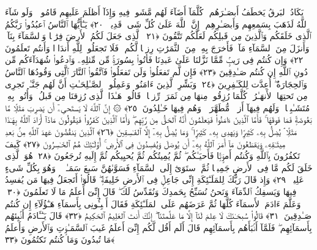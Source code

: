  يَكَادُ ٱلبَرقُ يَخطَفُ أَبصَـٰرَهُم ۖ كُلَّمَآ أَضَآءَ لَهُم مَّشَوا۟ فِيهِ وَإِذَآ أَظلَمَ عَلَيهِم قَامُوا۟ ۚ وَلَو شَآءَ ٱللَّهُ لَذَهَبَ بِسَمعِهِم وَأَبصَـٰرِهِم ۚ إِنَّ ٱللَّهَ عَلَىٰ كُلِّ شَىءٍۢ قَدِيرٌۭ ﴿٢٠﴾
 يَـٰٓأَيُّهَا ٱلنَّاسُ ٱعبُدُوا۟ رَبَّكُمُ ٱلَّذِى خَلَقَكُم وَٱلَّذِينَ مِن قَبلِكُم لَعَلَّكُم تَتَّقُونَ ﴿٢١﴾
 ٱلَّذِى جَعَلَ لَكُمُ ٱلأَرضَ فِرَٰشًۭا وَٱلسَّمَآءَ بِنَآءًۭ وَأَنزَلَ مِنَ ٱلسَّمَآءِ مَآءًۭ فَأَخرَجَ بِهِۦ مِنَ ٱلثَّمَرَٰتِ رِزقًۭا لَّكُم ۖ فَلَا تَجعَلُوا۟ لِلَّهِ أَندَادًۭا وَأَنتُم تَعلَمُونَ ﴿٢٢﴾
 وَإِن كُنتُم فِى رَيبٍۢ مِّمَّا نَزَّلنَا عَلَىٰ عَبدِنَا فَأتُوا۟ بِسُورَةٍۢ مِّن مِّثلِهِۦ وَٱدعُوا۟ شُهَدَآءَكُم مِّن دُونِ ٱللَّهِ إِن كُنتُم صَـٰدِقِينَ ﴿٢٣﴾
 فَإِن لَّم تَفعَلُوا۟ وَلَن تَفعَلُوا۟ فَٱتَّقُوا۟ ٱلنَّارَ ٱلَّتِى وَقُودُهَا ٱلنَّاسُ وَٱلحِجَارَةُ ۖ أُعِدَّت لِلكَـٰفِرِينَ ﴿٢٤﴾
 وَبَشِّرِ ٱلَّذِينَ ءَامَنُوا۟ وَعَمِلُوا۟ ٱلصَّـٰلِحَـٰتِ أَنَّ لَهُم جَنَّـٰتٍۢ تَجرِى مِن تَحتِهَا ٱلأَنهَـٰرُ ۖ كُلَّمَا رُزِقُوا۟ مِنهَا مِن ثَمَرَةٍۢ رِّزقًۭا ۙ قَالُوا۟ هَـٰذَا ٱلَّذِى رُزِقنَا مِن قَبلُ ۖ وَأُتُوا۟ بِهِۦ مُتَشَـٰبِهًۭا ۖ وَلَهُم فِيهَآ أَزوَٟجٌۭ مُّطَهَّرَةٌۭ ۖ وَهُم فِيهَا خَـٰلِدُونَ ﴿٢٥﴾
 ۞ إِنَّ ٱللَّهَ لَا يَستَحىِۦٓ أَن يَضرِبَ مَثَلًۭا مَّا بَعُوضَةًۭ فَمَا فَوقَهَا ۚ فَأَمَّا ٱلَّذِينَ ءَامَنُوا۟ فَيَعلَمُونَ أَنَّهُ ٱلحَقُّ مِن رَّبِّهِم ۖ وَأَمَّا ٱلَّذِينَ كَفَرُوا۟ فَيَقُولُونَ مَاذَآ أَرَادَ ٱللَّهُ بِهَـٰذَا مَثَلًۭا ۘ يُضِلُّ بِهِۦ كَثِيرًۭا وَيَهدِى بِهِۦ كَثِيرًۭا ۚ وَمَا يُضِلُّ بِهِۦٓ إِلَّا ٱلفَـٰسِقِينَ ﴿٢٦﴾
 ٱلَّذِينَ يَنقُضُونَ عَهدَ ٱللَّهِ مِنۢ بَعدِ مِيثَـٰقِهِۦ وَيَقطَعُونَ مَآ أَمَرَ ٱللَّهُ بِهِۦٓ أَن يُوصَلَ وَيُفسِدُونَ فِى ٱلأَرضِ ۚ أُو۟لَـٰٓئِكَ هُمُ ٱلخَـٰسِرُونَ ﴿٢٧﴾
 كَيفَ تَكفُرُونَ بِٱللَّهِ وَكُنتُم أَموَٟتًۭا فَأَحيَـٰكُم ۖ ثُمَّ يُمِيتُكُم ثُمَّ يُحيِيكُم ثُمَّ إِلَيهِ تُرجَعُونَ ﴿٢٨﴾
 هُوَ ٱلَّذِى خَلَقَ لَكُم مَّا فِى ٱلأَرضِ جَمِيعًۭا ثُمَّ ٱستَوَىٰٓ إِلَى ٱلسَّمَآءِ فَسَوَّىٰهُنَّ سَبعَ سَمَـٰوَٟتٍۢ ۚ وَهُوَ بِكُلِّ شَىءٍ عَلِيمٌۭ ﴿٢٩﴾
 وَإِذ قَالَ رَبُّكَ لِلمَلَـٰٓئِكَةِ إِنِّى جَاعِلٌۭ فِى ٱلأَرضِ خَلِيفَةًۭ ۖ قَالُوٓا۟ أَتَجعَلُ فِيهَا مَن يُفسِدُ فِيهَا وَيَسفِكُ ٱلدِّمَآءَ وَنَحنُ نُسَبِّحُ بِحَمدِكَ وَنُقَدِّسُ لَكَ ۖ قَالَ إِنِّىٓ أَعلَمُ مَا لَا تَعلَمُونَ ﴿٣٠﴾
 وَعَلَّمَ ءَادَمَ ٱلأَسمَآءَ كُلَّهَا ثُمَّ عَرَضَهُم عَلَى ٱلمَلَـٰٓئِكَةِ فَقَالَ أَنۢبِـُٔونِى بِأَسمَآءِ هَـٰٓؤُلَآءِ إِن كُنتُم صَـٰدِقِينَ ﴿٣١﴾
 قَالُوا۟ سُبحَـٰنَكَ لَا عِلمَ لَنَآ إِلَّا مَا عَلَّمتَنَآ ۖ إِنَّكَ أَنتَ ٱلعَلِيمُ ٱلحَكِيمُ ﴿٣٢﴾
 قَالَ يَـٰٓـَٔادَمُ أَنۢبِئهُم بِأَسمَآئِهِم ۖ فَلَمَّآ أَنۢبَأَهُم بِأَسمَآئِهِم قَالَ أَلَم أَقُل لَّكُم إِنِّىٓ أَعلَمُ غَيبَ ٱلسَّمَـٰوَٟتِ وَٱلأَرضِ وَأَعلَمُ مَا تُبدُونَ وَمَا كُنتُم تَكتُمُونَ ﴿٣٣﴾
